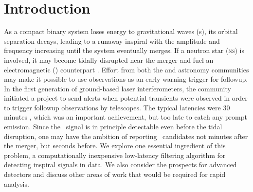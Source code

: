 \section{Introduction}
\label{sec:introduction}

As a compact binary system loses energy to gravitational waves (\GW{}s), its
orbital separation decays, leading to a runaway inspiral with the \GW{}
amplitude and frequency increasing until the system eventually merges.  If a
neutron star (\textsc{ns}) is involved, it may become tidally disrupted near
the merger and fuel an electromagnetic (\EM{}) counterpart
\citep{shibata:2007}.  Effort from both the \GW{} and astronomy communities may make it
possible to use \GW{} observations as an early warning trigger for \EM{}
followup. In the first generation of ground-based laser interferometers, the
\GW{} community initiated a project to send alerts when potential \GW{}
transients were observed in order to trigger followup observations by \EM{}
telescopes.  The typical latencies were 30 minutes \citep{HugheyGWPAW2011},
which was an important achievement, but too late to catch any prompt \EM{}
emission.  Since the \GW\ signal is in principle detectable even before the tidal
disruption, one may have the ambition of reporting \GW\ candidates not minutes
after the merger, but seconds before.  We explore one essential ingredient of this
problem, a computationally inexpensive low-latency filtering algorithm for detecting
inspiral signals in \GW{} data.  We also consider the prospects for advanced \GW{}
detectors and discuss other areas of work that would be required for rapid analysis.

